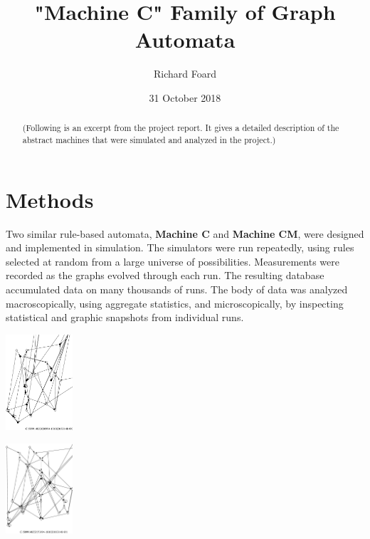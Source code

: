 \documentclass{tufte-handout}
\title{"Machine C" Family of Graph Automata}
\author{Richard Foard}
\date{31 October 2018}  %
\begin{document}
\maketitle%

\begin{abstract}
\noindent (Following is an excerpt from the project report. It gives a detailed
description of the abstract machines that were simulated and analyzed in the project.)
\end{abstract}

\section{Methods}

Two similar rule-based automata, \textbf{Machine C} and \textbf{Machine CM}, were designed
and implemented in simulation. The simulators were run repeatedly, using rules
selected at random from a large universe of possibilities. Measurements were recorded as the graphs
evolved through each run. The resulting database accumulated data on many thousands of runs. The body of data
was analyzed macroscopically, using aggregate statistics, and microscopically, by inspecting
statistical and graphic snapshots from individual runs.

\begin{marginfigure}
\hspace{3em}
\includegraphics[width=2.5cm]{evol2a_0.ps}
\end{marginfigure}

\begin{marginfigure}
\hspace{3em}
\includegraphics[width=2.5cm]{evol2a_1.ps}
\end{marginfigure}
\end{document}
